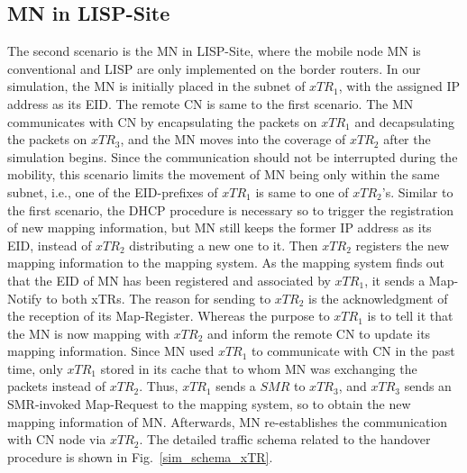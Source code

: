 \subsection{MN in LISP-Site}
\label{sec:ns3_analysis_xTR}
The second scenario is the MN in LISP-Site, where the mobile node MN is conventional and LISP are only implemented on the border routers. In our simulation, the MN is initially placed in the subnet of $xTR_1$, with the assigned IP address as its EID. The remote CN is same to the first scenario. The MN communicates with CN by encapsulating the packets on $xTR_1$ and decapsulating the packets on $xTR_3$, and the MN moves into the coverage of $xTR_2$ after the simulation begins. Since the communication should not be interrupted during the mobility, this scenario limits the movement of MN being only within the same subnet, i.e., one of the EID-prefixes of $xTR_1$ is same to one of $xTR_2$'s. %
Similar to the first scenario, the DHCP procedure is necessary so to trigger the registration of new mapping information, but MN still keeps the former IP address as its EID, instead of $xTR_2$ distributing a new one to it. Then $xTR_2$ registers the new mapping information to the mapping system. As the mapping system finds out that the EID of MN has been registered and associated by $xTR_1$, it sends a Map-Notify to both xTRs. The reason for sending to $xTR_2$ is the acknowledgment of the reception of its Map-Register. Whereas the purpose to $xTR_1$ is to tell it that the MN is now mapping with $xTR_2$ and inform the remote CN to update its mapping information. Since MN used $xTR_1$ to communicate with CN in the past time, only $xTR_1$ stored in its cache that to whom MN was exchanging the packets instead of $xTR_2$. Thus, $xTR_1$ sends a $SMR$ to $xTR_3$, and $xTR_3$ sends an SMR-invoked Map-Request to the mapping system, so to obtain the new mapping information of MN. Afterwards, MN re-establishes the communication with CN node via $xTR_2$. The detailed traffic schema related to the handover procedure is shown in Fig.~\ref{sim_schema_xTR}.
